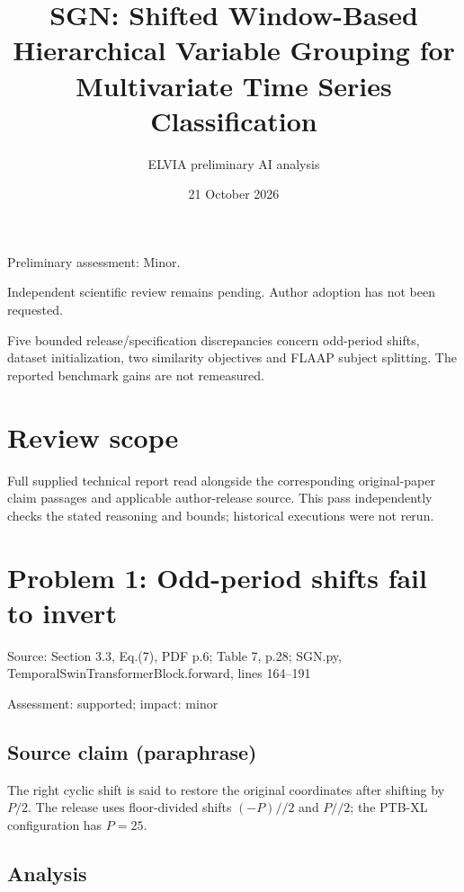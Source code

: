 \documentclass[11pt]{article}
\begin{document}
\title{SGN: Shifted Window-Based Hierarchical Variable Grouping for Multivariate Time Series Classification}

\author{ELVIA preliminary AI analysis}\date{21 October 2026}\maketitle

Preliminary assessment: Minor.\par

Independent scientific review remains pending. Author adoption has not been requested.

Five bounded release/specification discrepancies concern odd-period shifts, dataset initialization, two similarity objectives and FLAAP subject splitting. The reported benchmark gains are not remeasured.

\section*{Review scope}

Full supplied technical report read alongside the corresponding original-paper claim passages and applicable author-release source. This pass independently checks the stated reasoning and bounds; historical executions were not rerun.

\section*{Problem 1: Odd-period shifts fail to invert}

Source: Section 3.3, Eq.(7), PDF p.6; Table 7, p.28; SGN.py, TemporalSwinTransformerBlock.forward, lines 164–191

Assessment: supported; impact: minor

\subsection*{Source claim (paraphrase)}

The right cyclic shift is said to restore the original coordinates after shifting by \(P/2\). The release uses floor-divided shifts \((-P)//2\) and \(P//2\); the PTB-XL configuration has \(P=25\).

\subsection*{Analysis}
\end{document}
